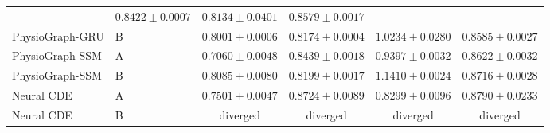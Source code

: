 \begin{table}[tbp]
\begin{tabular}{llcccc}
& $0.8422\pm0.0007$ 
& $0.8134\pm0.0401$ 
& $0.8579\pm0.0017$ 
\\
PhysioGraph-GRU 
& B 
& $0.8001\pm0.0006$ 
& $0.8174\pm0.0004$ 
& $1.0234\pm0.0280$ 
& $0.8585\pm0.0027$ 
\\
PhysioGraph-SSM 
& A 
& $0.7060\pm0.0048$ 
& $0.8439\pm0.0018$ 
& $0.9397\pm0.0032$ 
& $0.8622\pm0.0032$ 
\\
PhysioGraph-SSM 
& B 
& $0.8085\pm0.0080$ 
& $0.8199\pm0.0017$ 
& $1.1410\pm0.0024$ 
& $0.8716\pm0.0028$ 
\\
Neural CDE 
& A 
& $0.7501\pm0.0047$ 
& $0.8724\pm0.0089$ 
& $0.8299\pm0.0096$ 
& $0.8790\pm0.0233$ 
\\
Neural CDE 
& B 
& diverged 
& diverged 
& diverged 
& diverged 
\\
\bottomrule
\end{tabular}
\end{table}

